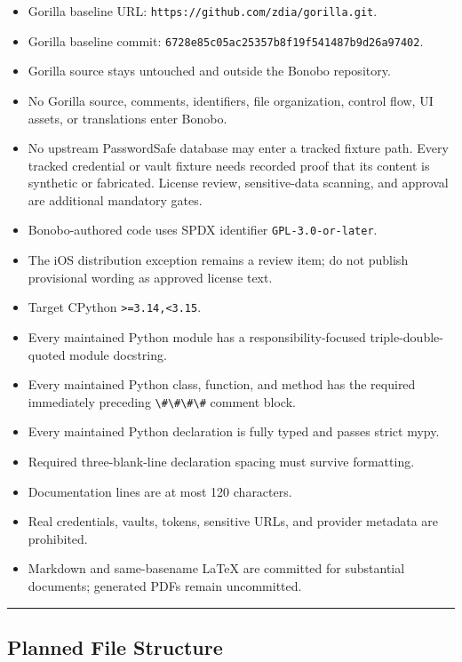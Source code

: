 \documentclass[
  letterpaper,
]{article}
\newcommand{\passthrough}[1]{#1}
\providecommand{\tightlist}{%
  \setlength{\itemsep}{0pt}\setlength{\parskip}{0pt}}
\begin{document}
\begin{itemize}
\tightlist
\item
  Gorilla baseline URL: \nolinkurl{https://github.com/zdia/gorilla.git}.
\item
  Gorilla baseline commit: \nolinkurl{6728e85c05ac25357b8f19f541487b9d26a97402}.
\item
  Gorilla source stays untouched and outside the Bonobo repository.
\item
  No Gorilla source, comments, identifiers, file organization, control flow, UI assets, or translations enter Bonobo.
\item
  No upstream PasswordSafe database may enter a tracked fixture path. Every tracked credential or vault fixture needs
  recorded proof that its content is synthetic or fabricated. License review, sensitive-data scanning, and approval are
  additional mandatory gates.
\item
  Bonobo-authored code uses SPDX identifier \nolinkurl{GPL-3.0-or-later}.
\item
  The iOS distribution exception remains a review item; do not publish provisional wording as approved license text.
\item
  Target CPython \nolinkurl{>=3.14,<3.15}.
\item
  Every maintained Python module has a responsibility-focused triple-double-quoted module docstring.
\item
  Every maintained Python class, function, and method has the required immediately preceding
  \passthrough{\lstinline!\#\#\#\#!} comment block.
\item
  Every maintained Python declaration is fully typed and passes strict mypy.
\item
  Required three-blank-line declaration spacing must survive formatting.
\item
  Documentation lines are at most 120 characters.
\item
  Real credentials, vaults, tokens, sensitive URLs, and provider metadata are prohibited.
\item
  Markdown and same-basename LaTeX are committed for substantial documents; generated PDFs remain uncommitted.
\end{itemize}

\begin{center}\rule{0.5\linewidth}{0.5pt}\end{center}

\subsection{Planned File Structure}\label{planned-file-structure}
\end{document}
